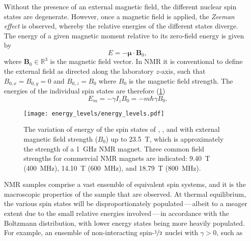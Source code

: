 Without the presence of an external magnetic field, the different nuclear spin
states are degenerate. However, once a magnetic field is applied, the
\emph{Zeeman effect} is observed, whereby the relative energies of the
different states diverge. The energy of a given magnetic moment relative to its
zero-field energy is given by
\begin{equation}
  E = - \symbf{\mu} \cdot \symbf{B}_0,
\end{equation}
where $\symbf{B}_0 \in \mathbb{R}^3$ is the magnetic field vector. In \ac{NMR}
it is conventional to define the external field as directed along the
laboratory $z$-axis, such that $B_{0,x} = B_{0,y} = 0$ and $B_{0,z} = B_0$
where $B_0$ is the magnetic field strength. The energies of the individual spin
states are therefore (\cref{fig:energy_levels})
\begin{equation}
  E_m = - \gamma I_z B_0 = -m \hbar \gamma B_0.
\end{equation}
\begin{figure}%
    \centering%
    \texttt{[image: energy\_levels/energy\_levels.pdf]}%
    \caption[%
        The variation of energy of the spin states of ,
        , and  with external magnetic
        field strength.
    ]{%
        The variation of energy of the spin states of ,
        , and  with external magnetic
        field strength ($B_0$) up to \qty{23.5}{\tesla}, which is
        approximately the strength of a \qty{1}{\giga \hertz} \ac{NMR} magnet.
        Three common field strengths for commercial NMR magnets are indicated:
        \qty{9.40}{\tesla} (\qty{400}{\mega\hertz}), \qty{14.10}{\tesla}
        (\qty{600}{\mega\hertz}), and \qty{18.79}{\tesla}
        (\qty{800}{\mega\hertz}). 
    }%
    \label{fig:energy_levels}%
\end{figure}%
\ac{NMR} samples comprise a vast ensemble of equivalent spin systems, and it is
the macroscopic properties of the sample that are observed.
At thermal equilibrium, the various spin states will be disproportionately
populated\,---\,albeit to a meager extent due to the small
relative energies involved\,---\,in accordance with the Boltzmann
distribution, with lower energy states being more heavily populated. For
example, an ensemble of
non-interacting spin-$\nicefrac{1}{2}$ nuclei with $\gamma > 0$, such as
